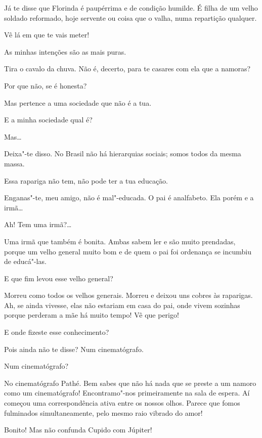 \begin{linenumbers}
 Já te disse que
Florinda é paupérrima e de condição
humilde. É filha de um velho soldado
reformado, hoje servente ou coisa que o valha, numa repartição
qualquer.

 Vê lá em que te vais meter!

 As minhas intenções são as mais puras.

 Tira o cavalo da chuva. Não é,
decerto, para te casares com ela que a namoras?

 Por que não, se é honesta?

 Mas pertence a uma sociedade que não é a tua.

 E a minha sociedade qual é?

 Mas\ldots{}

 Deixa"-te
disso. No Brasil não há hierarquias sociais; somos
todos da mesma massa.

 Essa rapariga não tem,
não pode ter a tua educação.

 Enganas"-te, meu
amigo, não é mal"-educada. O pai é analfabeto. Ela
porém e a irmã\ldots{}

 Ah! Tem uma irmã?\ldots{}

 Uma irmã
que também é bonita. Ambas sabem ler e são muito
prendadas, porque um velho general muito bom e de quem o pai
foi ordenança se incumbiu de educá"-las.

 E que fim levou
esse velho general?

 Morreu como todos
os velhos generais. Morreu e deixou uns cobres às
raparigas. Ah, se ainda vivesse, elas não estariam
em casa do pai, onde vivem sozinhas porque perderam a
mãe há muito tempo! Vê que perigo!

 E onde fizeste esse
conhecimento?

 Pois ainda
não te disse? Num cinematógrafo.

 Num cinematógrafo?

 No
cinematógrafo Pathé. Bem sabes que não há
nada que se preste a um namoro como um
cinematógrafo! Encontramo"-nos primeiramente na sala
de espera. Aí começou uma correspondência
ativa entre os nossos olhos. Parece que fomos fulminados
simultaneamente, pelo mesmo raio vibrado do amor!

 Bonito! Mas
não confunda Cupido com Júpiter!


\end{linenumbers}
